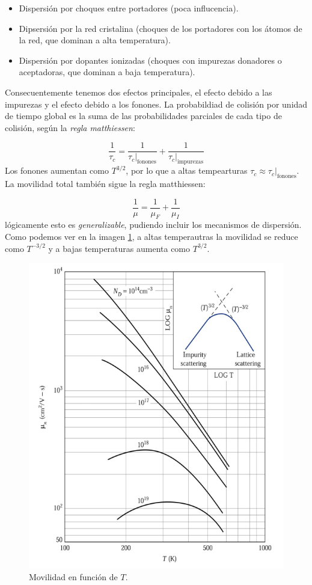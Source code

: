 \begin{itemize}
	\item Dispersión por choques entre portadores (poca influcencia).
	\item Dipsersión por la red cristalina (choques de los portadores con los átomos de la red, que dominan a alta temperatura).
	\item Dispersión por dopantes ionizadas (choques con impurezas donadores o aceptadoras, que dominan a baja temperatura).
\end{itemize}
Consecuentemente tenemos dos efectos principales, el efecto debido a las impurezas y el efecto debido a los fonones. La probabildiad de colisión por unidad de tiempo global es la suma de las probabilidades parciales de cada tipo de colisión, según la \textit{regla matthiessen}:

\begin{equation}
	\frac{1}{\tau_c} = \frac{1}{\tau_c|_{\text{fonones}}}+\frac{1}{\tau_c|_{\text{impurezas}}}
\end{equation}
Los fonones aumentan como $T^{3/2}$, por lo que a altas tempearturas $\tau_c\approx \tau_c|_{\text{fonones}}$. La movilidad total también sigue la regla matthiessen:

\begin{equation}
	\frac{1}{\mu}=\frac{1}{\mu_F}+\frac{1}{\mu_I}
\end{equation}
lógicamente esto es \textit{generalizable}, pudiendo incluir los mecanismos de dispersión. Como podemos ver en la imagen \cref{Fig:02-02}, a altas temperautras la movilidad se reduce como $T^{-3/2}$ y a bajas temperaturas aumenta como $T^{3/2}$.

\begin{figure}[h!] \centering
	\includegraphics[width=0.6\linewidth]{Cuerpo/Ch_02/02_Movilidad.png}
	\caption{Movilidad en función de $T$.}
	\label{Fig:02-02}
\end{figure}

